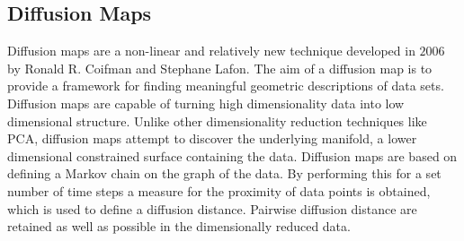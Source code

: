 \subsection{Diffusion Maps}
Diffusion maps are a non-linear and relatively new technique developed in $2006$ by Ronald R. Coifman and Stephane Lafon.\cite{Coifman2006} The aim of a diffusion map is to provide a framework for finding meaningful geometric descriptions of data sets. Diffusion maps are capable of turning high dimensionality data into low dimensional structure. Unlike other dimensionality reduction techniques like PCA, diffusion maps attempt to discover the underlying manifold, a lower dimensional constrained surface containing the data. Diffusion maps are based on defining a Markov chain on the graph of the data. By performing this for a set number of time steps a measure for the proximity of data points is obtained, which is used to define a diffusion distance. Pairwise diffusion distance are retained as well as possible in the dimensionally reduced data.

